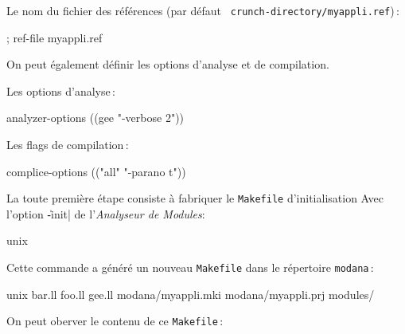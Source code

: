 Le nom du fichier des r\'{e}f\'{e}rences (par d\'{e}faut {\tt
crunch-directory/myappli.ref})\,: 
\begin{Code*}
        ; ref-file myappli.ref
\end{Code*}

On peut \'{e}galement d\'{e}finir les options d'analyse et de compilation.

Les options d'analyse\,:
\begin{Code*}
        analyzer-options ((gee "-verbose 2"))
\end{Code*}

Les flags de compilation\,:
\begin{Code*}
        complice-options (("all" "-parano t"))
\end{Code*}


La toute premi\`{e}re \'{e}tape consiste \`{a} fabriquer le {\tt Makefile}
d'initialisation Avec l'option \|-init| de l'{\em Analyseur de Modules}:
\begin{Code*}
unix%
\end{Code*}
Cette commande a g\'{e}n\'{e}r\'{e} un nouveau {\tt Makefile} dans le
r\'{e}pertoire {\tt modana}\,:
\begin{Longcode*}
unix%
bar.ll
foo.ll
gee.ll
modana/myappli.mki
modana/myappli.prj
modules/
\end{Longcode*}
On peut oberver le contenu de ce {\tt Makefile}\,:
